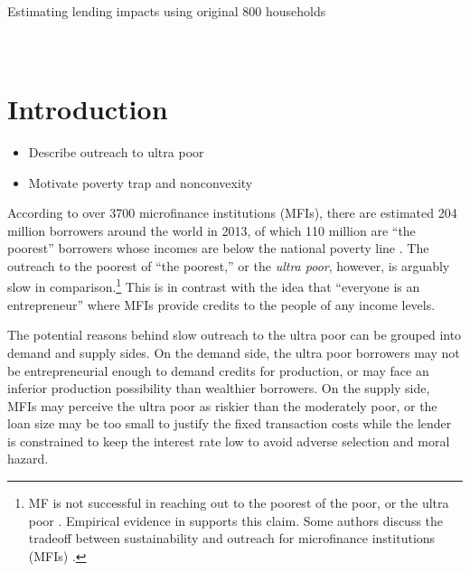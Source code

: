 


\setlength{\baselineskip}{12pt}

\hfil Estimating lending impacts using original 800 households\\

\hfil\MonthDY\\
\hfil{\footnotesize\currenttime}\\



\newpage
\setcounter{tocdepth}{3}
\tableofcontents
\newpage

\setlength{\parindent}{1em}
\vspace{2ex}








\renewcommand{\thefootnote}{*\arabic{footnote}}
\setcounter{footnote}{0}

\section{Introduction}

\begin{itemize}
\vspace{1.0ex}\setlength{\itemsep}{1.0ex}\setlength{\baselineskip}{12pt}
\item	Describe outreach to ultra poor
\item	Motivate poverty trap and nonconvexity
\end{itemize}

	According to over 3700 microfinance institutions (MFIs), there are estimated 204 million borrowers around the world in 2013, of which 110 million are ``the poorest'' borrowers whose incomes are below the national poverty line \citep{MFGateway2015}. The outreach to the poorest of ``the poorest,'' or the \textit{ultra poor}, however, is arguably slow in comparison.\footnote{MF is not successful in reaching out to the poorest of the poor, or the ultra poor \citep[][]{Scully2004}. Empirical evidence in \citet{Yaron1994, Navajas2000, RahmanRazzaque2000, AghionMorduch2007} supports this claim. Some authors discuss the tradeoff between sustainability and outreach for microfinance institutions (MFIs) \citet{HermesLensink2011, HermesLensinkMeesters2011, Cull2011}. } This is in contrast with the idea that ``everyone is an entrepreneur'' where MFIs provide credits to the people of any income levels.

	The potential reasons behind slow outreach to the ultra poor can be grouped into demand and supply sides. On the demand side, the ultra poor borrowers may not be entrepreneurial enough to demand credits for production, or may face an inferior production possibility than wealthier borrowers. On the supply side, MFIs may perceive the ultra poor as riskier than the moderately poor, or the loan size may be too small to justify the fixed transaction costs while the lender is constrained to keep the interest rate low to avoid adverse selection and moral hazard. 

